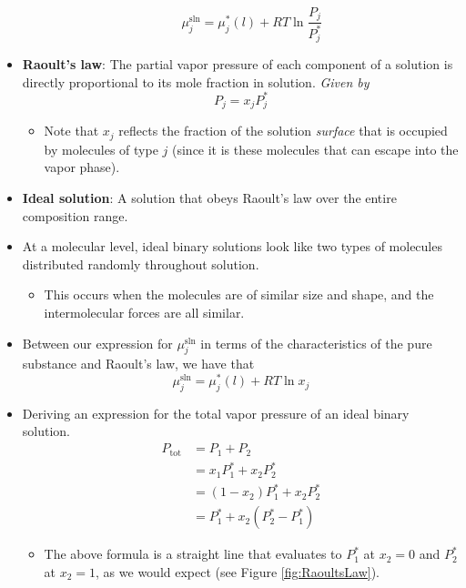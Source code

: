 \documentclass[../notes.tex]{subfiles}
\begin{document}
\begin{itemize}
\begin{itemize}
        \begin{equation*}
            \mu_j^\text{sln} = \mu_j^*(l)+RT\ln\frac{P_j}{P_j^*}
        \end{equation*}
    \end{itemize}
    \item \textbf{Raoult's law}: The partial vapor pressure of each component of a solution is directly proportional to its mole fraction in solution. \emph{Given by}
    \begin{equation*}
        P_j = x_jP_j^*
    \end{equation*}
    \begin{itemize}
        \item Note that $x_j$ reflects the fraction of the solution \emph{surface} that is occupied by molecules of type $j$ (since it is these molecules that can escape into the vapor phase).
    \end{itemize}
    \item \textbf{Ideal solution}: A solution that obeys Raoult's law over the entire composition range.
    \item At a molecular level, ideal binary solutions look like two types of molecules distributed randomly throughout solution.
    \begin{itemize}
        \item This occurs when the molecules are of similar size and shape, and the intermolecular forces are all similar.
    \end{itemize}
    \item Between our expression for $\mu_j^\text{sln}$ in terms of the characteristics of the pure substance and Raoult's law, we have that
    \begin{equation*}
        \mu_j^\text{sln} = \mu_j^*(l)+RT\ln x_j
    \end{equation*}
    \item Deriving an expression for the total vapor pressure of an ideal binary solution.
    \begin{align*}
        P_\text{tot} &= P_1+P_2\\
        &= x_1P_1^*+x_2P_2^*\\
        &= (1-x_2)P_1^*+x_2P_2^*\\
        &= P_1^*+x_2(P_2^*-P_1^*)
    \end{align*}
    \begin{itemize}
        \item The above formula is a straight line that evaluates to $P_1^*$ at $x_2=0$ and $P_2^*$ at $x_2=1$, as we would expect (see Figure \ref{fig:RaoultsLaw}).

\end{itemize}
\end{itemize}
\end{document}
